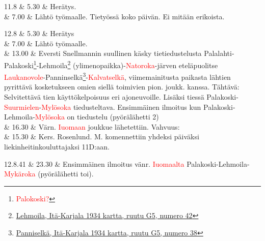 \documentclass[11pt,a5paper,oneside]{book}
\begin{document}
11.8 & 5.30 & Herätys. \\

& 7.00 & Lähtö työmaalle. \newline Tietyössä koko päivän. \newline Ei mitään erikoista. \\

\taulustop


12.8 & 5.30 & Herätys \\

& 7.00 & Lähtö työmaalle. \\

& 13.00 & Eversti Snellmannin suullinen käsky tietiedustelusta Palalahti-Palakoski\footnote{\textcolor{red}{Palokoski?}}-Lehmoila\footnote{\href{https://www.google.fi/maps/place/61\%C2\%B021'43.9\%22N+32\%C2\%B029'59.3\%22E/}{Lehmoila, Itä-Karjala 1934 kartta, ruutu G5, numero 42}} (ylimenopaikka)-\textcolor{red}{Natoroka}-järven eteläpuolitse \textcolor{red}{Laukanovole}-Panninselkä\footnote{\href{https://www.google.fi/maps/place/61\%C2\%B023'52.2\%22N+32\%C2\%B046'25.9\%22E/@61.397831,32.7716833,901m/}{Panniselkä, Itä-Karjala 1934 kartta, ruutu G5, numero 38}}-\textcolor{red}{Kalvatselkä}, viimemainitusta paikasta lähtien pyrittävä kosketukseen omien siellä toimivien pion. joukk. kanssa. Tähtävä: Selvitettävä tien käyttökelpoisuus eri ajoneuvoille. Lisäksi tiessä Palakoski-\textcolor{red}{Suurmielen}-\textcolor{red}{Mylösoka} tiedusteltava. \newline Ensimmäinen ilmoitus kun Palakoski-Lehmoila-\textcolor{red}{Mylösoka} on tiedustelu (pyörälähetti 2) \\

& 16.30 & Värn. \textcolor{red}{Iuomaan} joukkue lähetettiin. Vahvuus: \newline \\

& 15.30 & Kers. Rosenlund. M. komennettiin yhdeksi päiväksi liekinheitinkouluttajaksi 11D:aan. \\
\newpage

12.8.41 & 23.30 & Ensimmäinen ilmoitus vänr. \textcolor{red}{Iuomaalta} Palakoski-Lehmoila-\textcolor{red}{Mykäroka} (pyörälähetti toi). \newline\newline\newline\newline\newline \\
\end{document}
